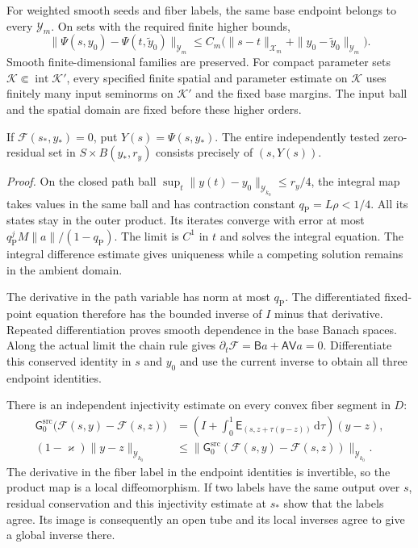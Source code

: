 \documentclass[
  english,
  11pt,
  reqno]{amsart}
\begin{document}
For weighted smooth seeds and fiber labels, the same base endpoint
belongs to every \(\mathcal Y_m\). On sets with the required finite
higher bounds,%
 \[
\|\Psi(s,y_0)-\Psi(t,\widetilde y_0)\|_{\mathcal Y_m}
\le C_m\bigl(\|s-t\|_{\mathcal X_m}
                   +\|y_0-\widetilde y_0\|_{\mathcal Y_m}\bigr).
\] Smooth finite-dimensional families are preserved. For compact
parameter sets \(\mathcal K\Subset\operatorname{int}\mathcal K'\), every
specified finite spatial and parameter estimate on \(\mathcal K\) uses
finitely many input seminorms on \(\mathcal K'\) and the fixed base
margins. The input ball and the spatial domain are fixed before these
higher orders.

If \(\mathcal F(s_*,y_*)=0\), put \(Y(s)=\Psi(s,y_*)\). The entire
independently tested zero-residual set in \(S\times B(y_*,r_y)\)
consists precisely of \((s,Y(s))\).

\emph{Proof.} On the closed path ball
\(\sup_t\|y(t)-y_0\|_{\mathcal Y_{k_0}}\le r_y/4\), the integral map
takes values in the same ball and has contraction constant
\(q_{\mathrm P}=L\rho<1/4\). All its states stay in the outer product.
Its iterates converge with error at most
\(q_{\mathrm P}^jM\|a\|/(1-q_{\mathrm P})\). The limit is \(C^1\) in
\(t\) and solves the integral equation. The integral difference estimate
gives uniqueness while a competing solution remains in the ambient
domain.

The derivative in the path variable has norm at most \(q_{\mathrm P}\).
The differentiated fixed-point equation therefore has the bounded
inverse of \(I\) minus that derivative. Repeated differentiation proves
smooth dependence in the base Banach spaces. Along the actual limit the
chain rule gives
\(\partial_t\mathcal F=\mathsf B a+\mathsf A\mathsf V a=0\).
Differentiate this conserved identity in \(s\) and \(y_0\) and use the
current inverse to obtain all three endpoint identities.

There is an independent injectivity estimate on every convex fiber
segment in \(D\):%
 \[
\begin{aligned}
\mathsf G_0^{\mathrm{src}}\bigl(\mathcal F(s,y)-\mathcal F(s,z)\bigr)
&=\left(I+\int_0^1
\mathsf E_{(s,z+\tau(y-z))}\,\mathrm d\tau\right)(y-z),\\
(1-\varkappa)\|y-z\|_{\mathcal Y_{k_0}}
&\le
\|\mathsf G_0^{\mathrm{src}}(\mathcal F(s,y)-\mathcal F(s,z))\|_{\mathcal Y_{k_0}}.
\end{aligned}
\] The derivative in the fiber label in the endpoint identities is
invertible, so the product map is a local diffeomorphism. If two labels
have the same output over \(s\), residual conservation and this
injectivity estimate at \(s_*\) show that the labels agree. Its image is
consequently an open tube and its local inverses agree to give a global
inverse there.
\end{document}
